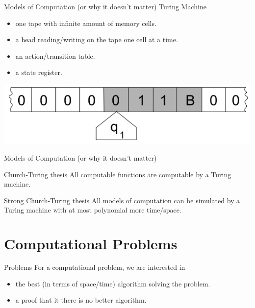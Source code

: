 \documentclass[c]{beamer}
\begin{document}
\begin{frame}{Models of Computation (or why it doesn't matter)}
Turing Machine

 \begin{itemize}
			\item one tape with infinite amount of memory cells.
			\item a head reading/writing on the tape one cell at a time.
			\item an action/transition table.
			\item a state register.
 \end{itemize}
 
\begin{center}
 \includegraphics[scale=0.3]{images/tm.png} 
\end{center}
\end{frame}	

\begin{frame}{Models of Computation (or why it doesn't matter)}  
	\begin{block}{ Church-Turing thesis }
		All computable functions are computable by a Turing machine.
    \end{block}
    \begin{block}{ Strong Church-Turing thesis }
		All models of computation can be simulated by a Turing machine with at most polynomial more time/space.
    \end{block}
\end{frame}

\section{Computational Problems}
\begin{frame}{Problems}
         For a computational problem, we are interested in
         \begin{itemize}
			\item the best (in terms of space/time) algorithm solving the problem.
			\item a proof that it there is no better algorithm.
		\end{itemize}	  
	
\end{frame}
\end{document}

